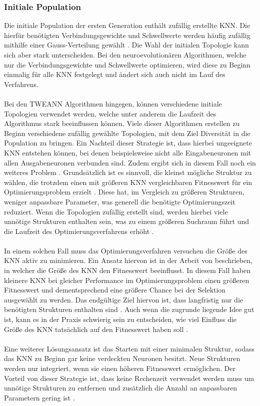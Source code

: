 \subsubsection{Initiale Population}
Die initiale Population der ersten Generation enthält zufällig erstellte \ac{KNN}. Die hierfür benötigten Verbindungsgewichte und Schwellwerte werden häufig zufällig mithilfe einer Gauss-Verteilung gewählt \cite{mcintyre_neatpython}. Die Wahl der initialen Topologie kann sich aber stark unterscheiden. Bei den neuroevolutionären Algorithmen, welche nur die Verbindungsgewichte und Schwellwerte optimieren, wird diese zu Beginn einmalig für alle \ac{KNN} festgelegt und ändert sich auch nicht im Lauf des Verfahrens. 
\\\\
Bei den \ac{TWEANN} Algorithmen hingegen, können verschiedene initiale Topologien verwendet werden, welche unter anderem die Laufzeit des Algorithmus stark beeinflussen können. Viele dieser Algorithmen erstellen zu Beginn verschiedene zufällig gewählte Topologien, mit dem Ziel Diversität in die Population zu bringen. Ein Nachteil dieser Strategie ist, dass hierbei ungeeignete \ac{KNN} entstehen können, bei denen beispielsweise nicht alle Eingabeneuronen mit allen Ausgabeneuronen verbunden sind. Zudem ergibt sich in diesem Fall noch ein weiteres Problem \cite{stanley2002evolving}. Grundsätzlich ist es sinnvoll, die kleinst mögliche Struktur zu wählen, die trotzdem einen mit größeren \ac{KNN} vergleichbaren Fitnesswert für ein Optimierungsproblem erzielt \cite{zhang1993evolving}. Diese hat, im Vergleich zu größeren Strukturen, weniger anpassbare Parameter, was generell die benötigte Optimierungszeit reduziert. Wenn die Topologien zufällig erstellt sind, werden hierbei viele unnötige Strukturen enthalten sein, was zu einem größeren Suchraum führt und die Laufzeit des Optimierungsverfahrens erhöht \cite{stanley2002evolving}. 
\\\\
In einem solchen Fall muss das Optimierungsverfahren versuchen die Größe des \ac{KNN} aktiv zu minimieren. Ein Ansatz hiervon ist in der Arbeit von \citeauthor{zhang1993evolving} beschrieben, in welcher die Größe des \ac{KNN} den Fitnesswert beeinflusst. In diesem Fall haben kleinere \ac{KNN} bei gleicher Performance im Optimierungsproblem einen größeren Fitnesswert und dementsprechend eine größere Chance bei der Selektion ausgewählt zu werden. Das endgültige Ziel hiervon ist, dass langfristig nur die benötigten Strukturen enthalten sind \cite{zhang1993evolving}. Auch wenn die zugrunde liegende Idee gut ist, kann es in der Praxis schwierig sein zu entscheiden, wie viel Einfluss die Größe des \ac{KNN} tatsächlich auf den Fitnesswert haben soll \cite{stanley2002evolving}.
\\\\
Eine weiterer Lösungsansatz ist das Starten mit einer minimalen Struktur, sodass das \ac{KNN} zu Beginn gar keine verdeckten Neuronen besitzt. Neue Strukturen werden nur integriert, wenn sie einen höheren Fitnesswert ermöglichen. Der Vorteil von dieser Strategie ist, dass keine Rechenzeit verwendet werden muss um unnötige Strukturen zu entfernen und zusätzlich die Anzahl an anpassbaren Parametern gering ist \cite{stanley2002evolving}.

